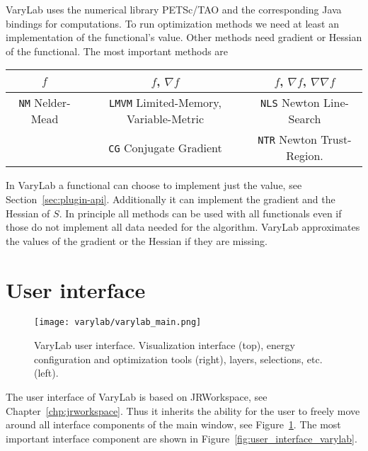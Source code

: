\documentclass[Thesis.tex]{subfiles}
\begin{document}
{\sc VaryLab} uses the numerical library {\sc PETSc}/{\sc TAO} \cite{petsc-user-ref, petsc-web-page, tao-user-ref} and the corresponding {\sc Java} bindings \cite{jpetsctao-web-page} for computations. To run optimization methods we need at least an implementation of the functional's value. Other methods need gradient or Hessian of the functional. The most important methods are
 
\begin{tabular}{c | c | c}
	$f$ & $f$, $\nabla f$ & $f$, $\nabla f$, $\nabla\nabla f$\\ \hline
	{\tt NM} Nelder-Mead & {\tt LMVM} Limited-Memory, Variable-Metric & {\tt NLS} Newton Line-Search \\
	& {\tt CG} Conjugate Gradient & {\tt NTR} Newton Trust-Region.
\end{tabular}

In {\sc VaryLab} a functional can choose to implement just the value, see Section~\ref{sec:plugin-api}. Additionally it can implement the gradient and the Hessian of $S$. In principle all methods can be used with all functionals even if those do not implement all data needed for the algorithm. {\sc VaryLab} approximates the values of the gradient or the Hessian if they are missing. 


\section{User interface}
\label{sec:ui_varylab}

\begin{figure}
    \begin{center}
    \texttt{[image: varylab/varylab\_main.png]}
    \caption{{\sc VaryLab} user interface. Visualization interface (top), energy configuration and optimization tools (right), layers, selections, etc. (left).}
    \label{fig:varylab_main_ui}
    \end{center}
\end{figure}

The user interface of {\sc VaryLab} is based on {\sc JRWorkspace}, see Chapter~\ref{chp:jrworkspace}. Thus it inherits the ability for the user to freely move around all interface components of the main window, see Figure~\ref{fig:varylab_main_ui}. The most important interface component are shown in Figure~\ref{fig:user_interface_varylab}.
\end{document}
